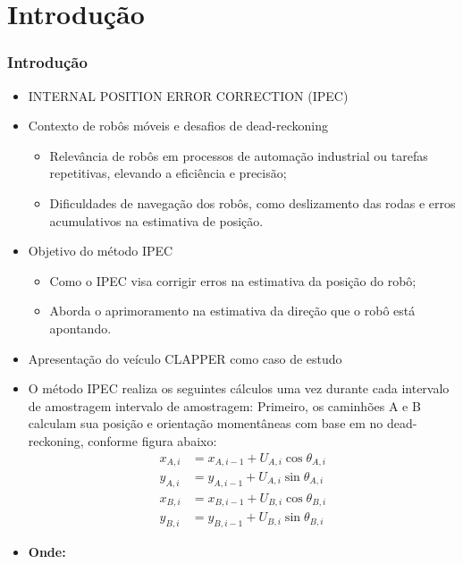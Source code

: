 \documentclass[xcolor=dvipsnames, aspectratio=169]{beamer}
\begin{document}
\section{Introdução}
\begin{frame}
  \frametitle{Introdução}
  \begin{itemize}
    \item INTERNAL POSITION ERROR CORRECTION (IPEC)
    \item Contexto de robôs móveis e desafios de dead-reckoning
      \begin{itemize}
        \item Relevância de robôs em processos de automação industrial ou tarefas repetitivas, elevando a eficiência e precisão;
        \item Dificuldades de navegação dos robôs, como deslizamento das rodas e erros acumulativos na estimativa de posição.
      \end{itemize}
    \item Objetivo do método IPEC
      \begin{itemize}
        \item Como o IPEC visa corrigir erros na estimativa da posição do robô;
        \item Aborda o aprimoramento na estimativa da direção que o robô está apontando.
      \end{itemize}
    \item Apresentação do veículo CLAPPER como caso de estudo
    \item O método IPEC realiza os seguintes cálculos uma vez durante cada intervalo de amostragem intervalo de amostragem: Primeiro, os caminhões A e B calculam sua posição e orientação momentâneas com base em
    no dead-reckoning, conforme figura abaixo:
    \newpage
    \begin{align}
      x_{A,i} &= x_{A,i-1} + U_{A,i} \cos \theta_{A,i} \\
      y_{A,i} &= y_{A,i-1} + U_{A,i} \sin \theta_{A,i} \\
      x_{B,i} &= x_{B,i-1} + U_{B,i} \cos \theta_{B,i} \\
      y_{B,i} &= y_{B,i-1} + U_{B,i} \sin \theta_{B,i}
    \end{align}
      
    \item \textbf{Onde:}
      

\end{itemize}
\end{frame}
\end{document}
